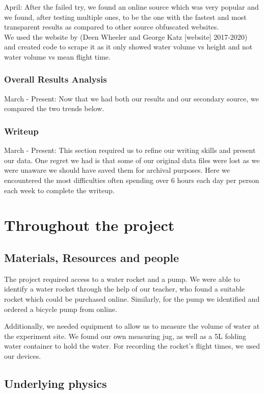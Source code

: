 \documentclass[14pt]{article}
\begin{document}
April: After the failed try, we found an online source which was very popular and we found, after testing multiple ones, to be the one with the fastest and most transparent results as compared to other source obfuscated websites.\\
We used the website by (Deen Wheeler and George Katz [website] 2017-2020) \cite{6} and created code to scrape it as it only showed water volume vs height and not water volume vs mean flight time.

\subsubsection{Overall Results Analysis}

March - Present: Now that we had both our results and our secondary source, we compared the two trends below.

\subsubsection{Writeup}
March - Present: This section required us to refine our writing skills and present our data. One regret we had is that some of our original data files were lost as we were unaware we should have saved them for archival purposes. Here we encountered the most difficulties often spending over 6 hours each day per person each week to complete the writeup.


\section{Throughout the project}
\subsection{Materials, Resources and people}
The project required access to a water rocket and a pump. We were able to identify a water rocket through the help of our teacher, who found
a suitable rocket which could be purchased online. Similarly, for the pump we identified and ordered a bicycle pump from online.

Additionally, we needed equipment to allow us to measure the volume of water at the experiment site. We found our own measuring jug, as well
as a 5L folding water container to hold the water. For recording the rocket’s flight times, we used  our devices.
\subsection{Underlying physics}
\end{document}
